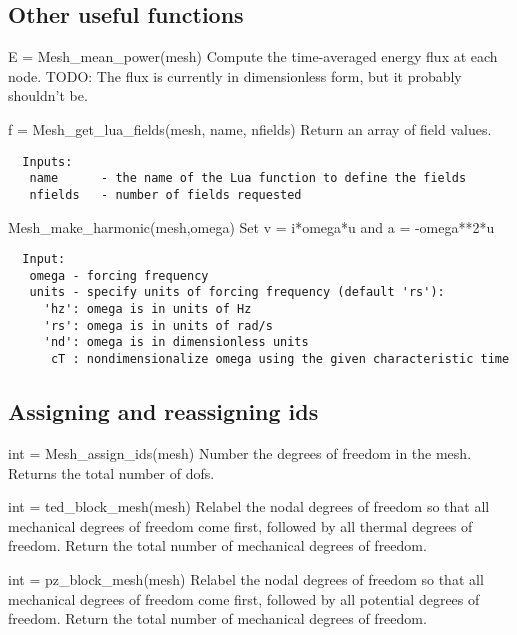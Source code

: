 \subsection{Other useful functions}
\begin{codelist}
  \item[ E = Mesh\_mean\_power(mesh)]
  Compute the time-averaged energy flux at each node.
  TODO: The flux is currently in dimensionless form, but it probably
   shouldn't be.

  \item[f = Mesh\_get\_lua\_fields(mesh, name, nfields)]
  Return an array of field values.
\begin{verbatim}
  Inputs:
   name      - the name of the Lua function to define the fields
   nfields   - number of fields requested
\end{verbatim}

  \item[Mesh\_make\_harmonic(mesh,omega)]
  Set v = i*omega*u and a = -omega**2*u
\begin{verbatim}
  Input:
   omega - forcing frequency
   units - specify units of forcing frequency (default 'rs'):
     'hz': omega is in units of Hz
     'rs': omega is in units of rad/s
     'nd': omega is in dimensionless units
      cT : nondimensionalize omega using the given characteristic time
\end{verbatim}

\end{codelist}

\subsection{Assigning and reassigning ids}
\begin{codelist}
  \item[int = Mesh\_assign\_ids(mesh)]
  Number the degrees of freedom in the mesh.
  Returns the total number of dofs.

  \item[int = ted\_block\_mesh(mesh)]
  Relabel the nodal degrees of freedom so that all mechanical degrees of
  freedom come first, followed by all thermal degrees of freedom.  Return
  the total number of mechanical degrees of freedom.

  \item[int = pz\_block\_mesh(mesh)]
  Relabel the nodal degrees of freedom so that all mechanical degrees of
  freedom come first, followed by all potential degrees of freedom.  Return
  the total number of mechanical degrees of freedom.

\end{codelist}

